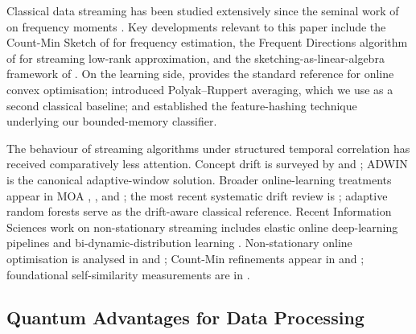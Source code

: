 \documentclass[preprint,12pt,authoryear]{elsarticle}
\begin{document}
Classical data streaming has been studied extensively since the seminal work of \citet{alon1999space} on frequency moments \citep{muthukrishnan2005data}. Key developments relevant to this paper include the Count-Min Sketch of \citet{cormode2005improved} for frequency estimation, the Frequent Directions algorithm of \citet{ghashami2016frequent} for streaming low-rank approximation, and the sketching-as-linear-algebra framework of \citet{woodruff2014sketching}. On the learning side, \citet{shalev2012online} provides the standard reference for online convex optimisation; \citet{polyak1992averaging} introduced Polyak--Ruppert averaging, which we use as a second classical baseline; and \citet{weinberger2009featurehashing} established the feature-hashing technique underlying our bounded-memory classifier.

The behaviour of streaming algorithms under structured temporal correlation has received comparatively less attention. Concept drift is surveyed by \citet{gama2014driftsurvey} and \citet{ditzler2015nonstationary}; ADWIN \citep{bifet2007adwin} is the canonical adaptive-window solution. Broader online-learning treatments appear in MOA \citep{bifet2010moa}, \citet{hoi2021online}, and \citet{gama2010knowledge}; the most recent systematic drift review is \citet{arora2024driftreview}; adaptive random forests \citep{gomes2017adaptiverf} serve as the drift-aware classical reference. Recent Information Sciences work on non-stationary streaming includes elastic online deep-learning pipelines \citep{su2024elasticonline} and bi-dynamic-distribution learning \citep{yan2024bidynamic}. Non-stationary online optimisation is analysed in \citet{besbes2015non} and \citet{ben2010agnostic}; Count-Min refinements appear in \citet{benmazziane2022countmin} and \citet{cormode2011synopses}; foundational self-similarity measurements are in \citet{park2000selfsimilar}.

\subsection{Quantum Advantages for Data Processing}
\end{document}
